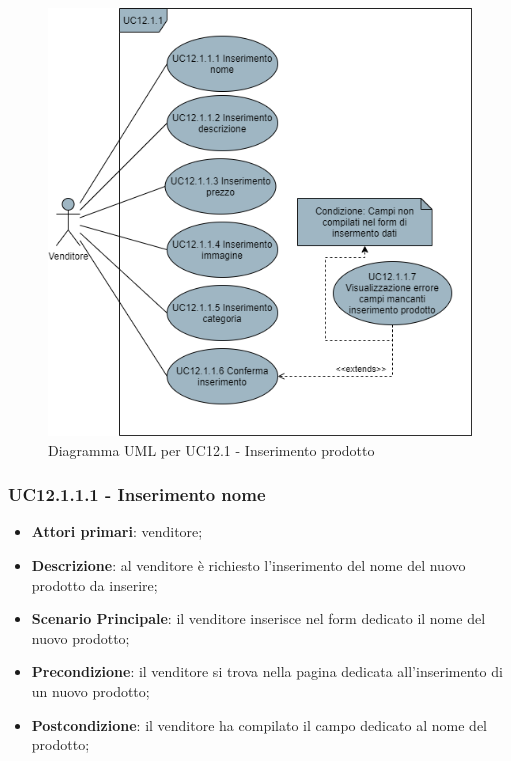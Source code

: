 \begin{figure}[H]
\centering
\includegraphics[scale=0.6]{res/UseCase/Immagini/InserimentoProdotto}
\caption{Diagramma UML per UC12.1 - Inserimento prodotto}
\end{figure}

\subsubsection{UC12.1.1.1 - Inserimento nome}
\begin{itemize}
\item \textbf{Attori primari}: venditore;
\item \textbf{Descrizione}: al venditore è richiesto l'inserimento del nome del nuovo prodotto da inserire;
\item \textbf{Scenario Principale}: il venditore inserisce nel form dedicato il nome del nuovo prodotto;
\item \textbf{Precondizione}: il venditore si trova nella pagina dedicata all'inserimento di un nuovo prodotto;
\item \textbf{Postcondizione}: il venditore ha compilato il campo dedicato al nome del prodotto;
\end{itemize}

